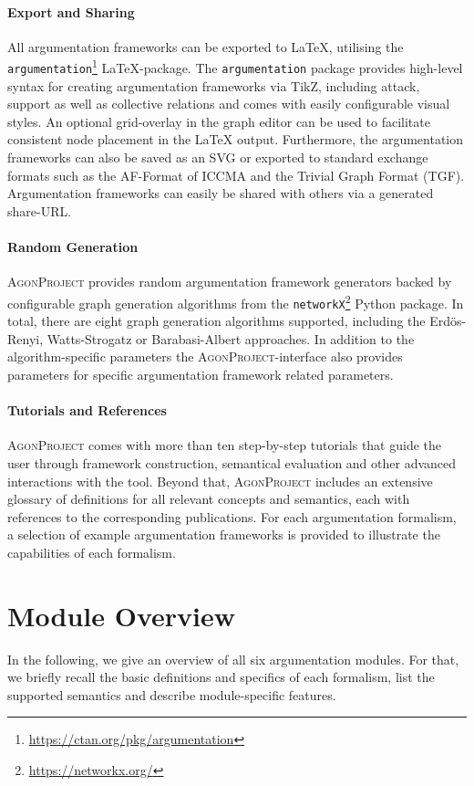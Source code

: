 \documentclass[
]{ceurart}
\newcommand{\agon}{\textsc{AgonProject}\xspace}
\begin{document}
\paragraph{Export and Sharing}
All argumentation frameworks can be exported to \LaTeX{}, utilising the \texttt{argumentation}\footnote{\url{https://ctan.org/pkg/argumentation}} \LaTeX{}-package.
The \texttt{argumentation} package provides high-level syntax for creating argumentation frameworks via TikZ, including attack, support as well as collective relations and comes with easily configurable visual styles.
An optional grid-overlay in the graph editor can be used to facilitate consistent node placement in the \LaTeX{} output.
Furthermore, the argumentation frameworks can also be saved as an SVG or exported to standard exchange formats such as the AF-Format of ICCMA and the Trivial Graph Format (TGF).
Argumentation frameworks can easily be shared with others via a generated share-URL.

\paragraph{Random Generation}
\agon provides random argumentation framework generators backed by configurable graph generation algorithms from the \texttt{networkX}\footnote{\url{https://networkx.org/}} Python package.
In total, there are eight graph generation algorithms supported, including the Erdös-Renyi, Watts-Strogatz or Barabasi-Albert approaches.
In addition to the algorithm-specific parameters the \agon-interface also provides parameters for specific argumentation framework related parameters.

\paragraph{Tutorials and References}
\agon comes with more than ten step-by-step tutorials that guide the user through framework construction, semantical evaluation and other advanced interactions with the tool.
Beyond that, \agon includes an extensive glossary of definitions for all relevant concepts and semantics, each with references to the corresponding publications.
For each argumentation formalism, a selection of example argumentation frameworks is provided to illustrate the capabilities of each formalism.


\section{Module Overview}\label{sec:modules}
In the following, we give an overview of all six argumentation modules.
For that, we briefly recall the basic definitions and specifics of each formalism, list the supported semantics and describe module-specific features.
\end{document}
